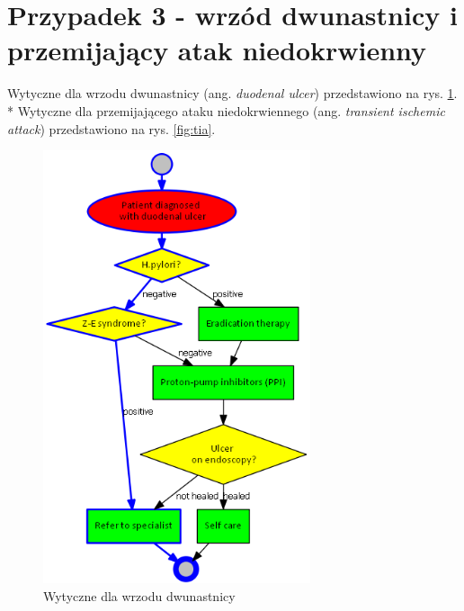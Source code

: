 \section{Przypadek 3 - wrzód dwunastnicy i przemijający atak niedokrwienny}
Wytyczne dla wrzodu dwunastnicy (ang. \textit{duodenal ulcer}) przedstawiono na rys. \ref{fig:du}.\\*
Wytyczne dla przemijającego ataku niedokrwiennego (ang. \textit{transient ischemic attack}) przedstawiono na rys. \ref{fig:tia}.
\begin{figure}[H]
\centering
\includegraphics[width=0.7\textwidth]{img/du.png}
\caption{Wytyczne dla wrzodu dwunastnicy}
\label{fig:du}
\end{figure}
\newpage
